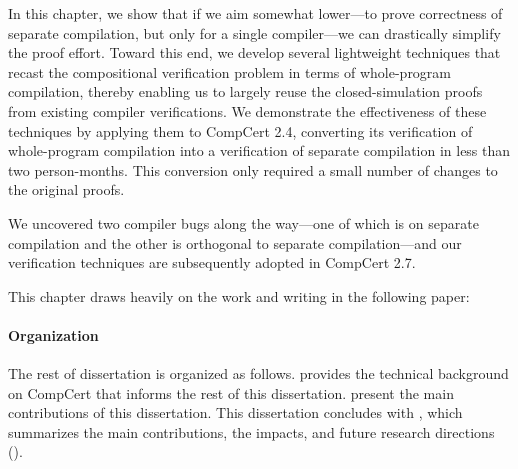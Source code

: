 In this chapter, we show that if we aim somewhat lower---to prove correctness of separate
compilation, but only for a single compiler---we can drastically simplify the proof effort.  Toward
this end, we develop several lightweight techniques that recast the compositional verification
problem in terms of whole-program compilation, thereby enabling us to largely reuse the
closed-simulation proofs from existing compiler verifications.  We demonstrate the effectiveness of
these techniques by applying them to CompCert 2.4, converting its verification of whole-program
compilation into a verification of separate compilation in less than two person-months.  This
conversion only required a small number of changes to the original proofs.

We uncovered two compiler bugs along the way---one of which is on separate compilation and the other
is orthogonal to separate compilation---and our verification techniques are subsequently adopted in
CompCert 2.7.

This chapter draws heavily on the work and writing in the following paper:


\paragraph{Organization}

The rest of dissertation is organized as follows.   provides the technical
background on CompCert that informs the rest of this dissertation.
 present the main contributions of this
dissertation.  This dissertation concludes with , which summarizes the main
contributions, the impacts, and future research directions ().





